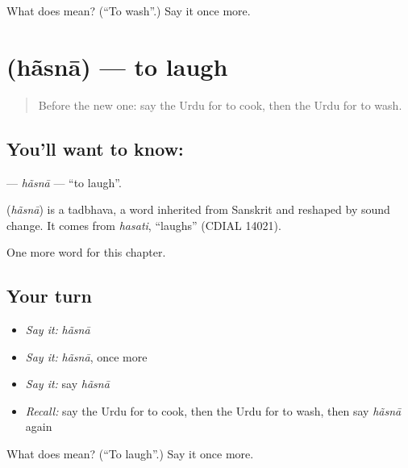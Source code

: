\begin{tcolorbox}[breakable,colback=teal!4,colframe=teal!35!black,title={Before you move on}]
What does  mean? (\textquotedblleft{}To wash\textquotedblright{}.) Say it once more.
\end{tcolorbox}
\section[\texorpdfstring{\ur{ہنسنا} (hãsnā)}{ہنسنا (hãsnā)}]{ (hãsnā) — to laugh}

\label{lesson:UR-C49-hasna}



\begin{quote}
Before the new one: say the Urdu for to cook, then the Urdu for to wash.
\end{quote}

\subsection*{You'll want to know: }
\textbf{} — \emph{hãsnā} — \textquotedblleft{}to laugh\textquotedblright{}.

\begin{cousinweb}
\textbf{} (\emph{hãsnā}) is a tadbhava, a word inherited from Sanskrit and reshaped by sound change. It comes from \emph{hasati}, \textquotedblleft{}laughs\textquotedblright{} (CDIAL 14021).
\end{cousinweb}

\begin{grammarlens}[title={What you've built}]
One more word for this chapter.
\end{grammarlens}

\subsection*{Your turn}
\begin{itemize}
\raggedright
  \item \emph{Say it:} \emph{hãsnā}
  \item \emph{Say it:} \emph{hãsnā}, once more
  \item \emph{Say it:} say \emph{hãsnā}
  \item \emph{Recall:} say the Urdu for to cook, then the Urdu for to wash, then say \emph{hãsnā} again
\end{itemize}

\begin{tcolorbox}[breakable,colback=teal!4,colframe=teal!35!black,title={Before you move on}]
What does  mean? (\textquotedblleft{}To laugh\textquotedblright{}.) Say it once more.
\end{tcolorbox}
